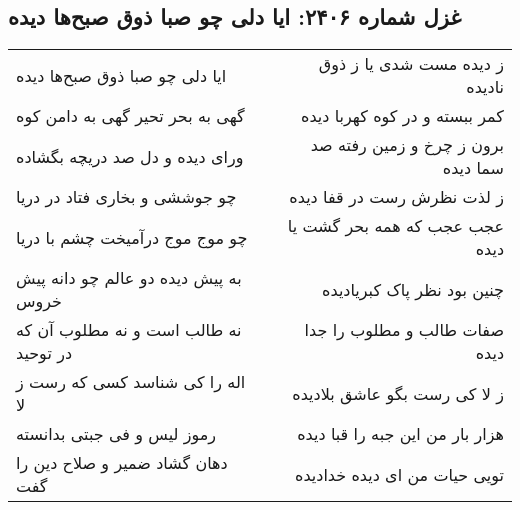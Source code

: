 \begin{center}
\section*{غزل شماره ۲۴۰۶: ایا دلی چو صبا ذوق صبح‌ها دیده}
\label{sec:2406}
\begin{longtable}{l p{0.5cm} r}
ایا دلی چو صبا ذوق صبح‌ها دیده
&&
ز دیده مست شدی یا ز ذوق نادیده
\\
گهی به بحر تحیر گهی به دامن کوه
&&
کمر ببسته و در کوه کهربا دیده
\\
ورای دیده و دل صد دریچه بگشاده
&&
برون ز چرخ و زمین رفته صد سما دیده
\\
چو جوششی و بخاری فتاد در دریا
&&
ز لذت نظرش رست در قفا دیده
\\
چو موج موج درآمیخت چشم با دریا
&&
عجب عجب که همه بحر گشت یا دیده
\\
به پیش دیده دو عالم چو دانه پیش خروس
&&
چنین بود نظر پاک کبریادیده
\\
نه طالب است و نه مطلوب آن که در توحید
&&
صفات طالب و مطلوب را جدا دیده
\\
اله را کی شناسد کسی که رست ز لا
&&
ز لا کی رست بگو عاشق بلادیده
\\
رموز لیس و فی جبتی بدانسته
&&
هزار بار من این جبه را قبا دیده
\\
دهان گشاد ضمیر و صلاح دین را گفت
&&
تویی حیات من ای دیده خدادیده
\\
\end{longtable}
\end{center}
